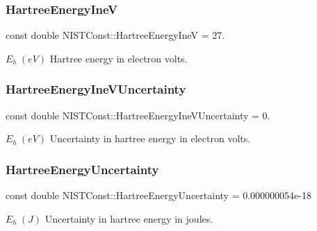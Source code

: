 \subsubsection{\texorpdfstring{Hartree\+Energy\+IneV}{HartreeEnergyIneV}}
{\footnotesize\ttfamily const double N\+I\+S\+T\+Const\+::\+Hartree\+Energy\+IneV = 27.}

$E_h \ (eV)$ Hartree energy in electron volts. \mbox{\label{group___hartree_energy_gaa6e7ae83f510023bdd88d80dae80f97d}} 
\subsubsection{\texorpdfstring{Hartree\+Energy\+Ine\+V\+Uncertainty}{HartreeEnergyIneVUncertainty}}
{\footnotesize\ttfamily const double N\+I\+S\+T\+Const\+::\+Hartree\+Energy\+Ine\+V\+Uncertainty = 0.}

$E_h \ (eV)$ Uncertainty in hartree energy in electron volts. \mbox{\label{group___hartree_energy_gaabdf38a4c491ca0f606bf042c8479801}} 
\subsubsection{\texorpdfstring{Hartree\+Energy\+Uncertainty}{HartreeEnergyUncertainty}}
{\footnotesize\ttfamily const double N\+I\+S\+T\+Const\+::\+Hartree\+Energy\+Uncertainty = 0.\+000000054e-\/18}

$E_h \ (J)$ Uncertainty in hartree energy in joules. 